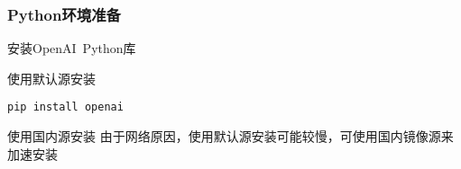 \begin{frame}[fragile]
	\frametitle{\textrm{Python}环境准备}
	安装\textrm{OpenAI~Python}库
	\begin{block}{使用默认源安装}
    \begin{lstlisting}[style=pythonstyle]
pip install openai
    \end{lstlisting}
    \end{block}
       \begin{block}{使用国内源安装}
	       由于网络原因，使用默认源安装可能较慢，可使用国内镜像源来加速安装\\
	       \vskip 3pt
	{\fontsize{7.5pt}{6.2pt}\selectfont{以下是使用阿里云源的示例:
        \begin{lstlisting}[style=pythonstyle]
pip install openai -i https://mirrors.aliyun.com/pypi/simple/
\end{lstlisting}}}
    \end{block}
\end{frame}
%
%
